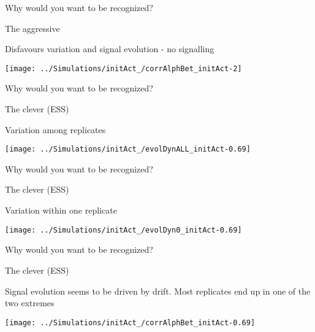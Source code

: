 \documentclass[
  ignorenonframetext,
]{beamer}
\begin{document}
\begin{frame}{Why would you want to be recognized?}
\protect\hypertarget{why-would-you-want-to-be-recognized-7}{}

\begin{block}{The aggressive}

Disfavours variation and signal evolution - no signalling

\begin{flushleft}\texttt{[image: ../Simulations/initAct\_/corrAlphBet\_initAct-2]} \end{flushleft}

\end{block}

\end{frame}

\begin{frame}{Why would you want to be recognized?}
\protect\hypertarget{why-would-you-want-to-be-recognized-8}{}

\begin{block}{The clever (ESS)}

Variation among replicates

\begin{flushleft}\texttt{[image: ../Simulations/initAct\_/evolDynALL\_initAct-0.69]} \end{flushleft}

\end{block}

\end{frame}

\begin{frame}{Why would you want to be recognized?}
\protect\hypertarget{why-would-you-want-to-be-recognized-9}{}

\begin{block}{The clever (ESS)}

Variation within one replicate

\begin{flushleft}\texttt{[image: ../Simulations/initAct\_/evolDyn0\_initAct-0.69]} \end{flushleft}

\end{block}

\end{frame}

\begin{frame}{Why would you want to be recognized?}
\protect\hypertarget{why-would-you-want-to-be-recognized-10}{}

\begin{block}{The clever (ESS)}

Signal evolution seems to be driven by drift. Most replicates end up in
one of the two extremes

\begin{flushleft}\texttt{[image: ../Simulations/initAct\_/corrAlphBet\_initAct-0.69]} \end{flushleft}

\end{block}

\end{frame}
\end{document}
